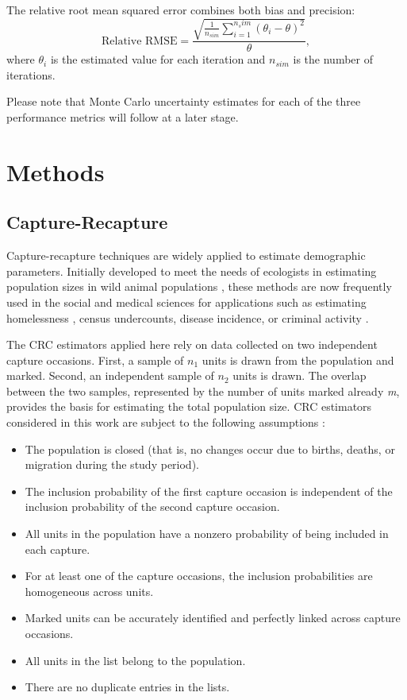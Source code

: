 \documentclass[12pt, a4paper]{article}
\begin{document}
The relative root mean squared error combines both bias and precision:
$$\text{Relative  RMSE} = \frac{\sqrt{\frac{1}{n_{sim}} \sum_{i=1}^{n_sim} (\theta_i - \theta)^2}}{\theta},$$
\noindent where $\theta_i$ is the estimated value for each iteration and $n_{sim}$ is the number of iterations. \par

Please note that Monte Carlo uncertainty estimates for each of the three performance metrics will follow at a later stage. 




\section{Methods}

\subsection{Capture-Recapture}
\noindent Capture-recapture techniques are widely applied to estimate demographic parameters. Initially developed to meet the needs of ecologists in estimating population sizes in wild animal populations \parencite{seber1982estimation}, these methods are now frequently used in the social and medical sciences for applications such as estimating homelessness \parencite{coumans2017estimating}, census undercounts, disease incidence, or criminal activity \parencite{bohning2018capture, pollock1991review}. \par
The CRC estimators applied here rely on data collected on two independent capture occasions. First, a sample of $n_{1}$ units is drawn from the population and marked. Second, an independent sample of $n_{2}$ units is drawn. The overlap between the two samples, represented by the number of units marked already \textit{ m}, provides the basis for estimating the total population size. 
CRC estimators considered in this work are subject to the following assumptions \parencite{otis1978statistical}:
\begin{itemize}
    \item The population is closed (that is, no changes occur due to births, deaths, or migration during the study period).
    \item The inclusion probability of the first capture occasion is independent of the inclusion probability of the second capture occasion.
    \item All units in the population have a nonzero probability of being included in each capture.
    \item For at least one of the capture occasions, the inclusion probabilities are homogeneous across units.
    \item Marked units can be accurately identified and perfectly linked across capture occasions.
    \item All units in the list belong to the population.
    \item There are no duplicate entries in the lists.
\end{itemize}
\end{document}
